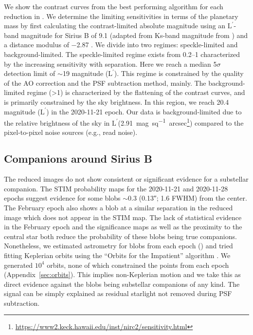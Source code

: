 \documentclass[twocolumn]{aastex631}
\newcommand\Lp{$\mathrm{L}^\prime$}
\begin{document}
We show the contrast curves from the best performing algorithm for each reduction in . We determine the limiting sensitivities in terms of the planetary mass by first calculating the contrast-limited absolute magnitude using an \Lp-band magnitude for Sirius B of 9.1 (adapted from Ks-band magnitude from \citealp{bonnet-bidaudADONISHighContrast2008a}) and a distance modulus of \num{-2.87} \citep{collaborationGaiaEarlyData2021a}. We divide  into two regimes: speckle-limited and background-limited. The speckle-limited regime exists from \qtyrange{0.2}{1}{\au} characterized by the increasing sensitivity with separation. Here we reach a median 5$\sigma$ detection limit of $\sim$19 magnitude (\Lp). This regime is constrained by the quality of the AO correction and the PSF subtraction method, mainly. The background-limited regime (\textgreater\qty{1}{\au}) is characterized by the flattening of the contrast curves, and is primarily constrained by the sky brightness. In this region, we reach 20.4 magnitude (\Lp) in the 2020-11-21 epoch. Our data is background-limited due to the relative brightness of the sky in \Lp (\qty{2.91}{mag\per sq. arcsec}\footnote{\url{https://www2.keck.hawaii.edu/inst/nirc2/sensitivity.html}}) compared to the pixel-to-pixel noise sources (e.g., read noise).

\subsection{Companions around Sirius B}

The reduced images do not show consistent or significant evidence for a substellar companion. The STIM probability maps for the 2020-11-21 and 2020-11-28 epochs suggest evidence for some blobs $\sim$\qty{0.3}{\au} (\ang{;;0.13}; 1.6 FWHM) from the center. The February epoch also shows a blob at a similar separation in the reduced image which does not appear in the STIM map. The lack of statistical evidence in the February epoch and the significance maps as well as the proximity to the central star both reduce the probability of these blobs being true companions. Nonetheless, we estimated astrometry for blobs from each epoch () and tried fitting Keplerian orbits using the ``Orbits for the Impatient'' algorithm \citep[OFTI;][]{bluntOrbitsImpatientBayesian2017a}. We generated $10^4$ orbits, none of which constrained the points from each epoch (Appendix~\ref{sec:orbits}). This implies non-Keplerian motion and we take this as direct evidence against the blobs being substellar companions of any kind. The signal can be simply explained as residual starlight not removed during PSF subtraction.
\end{document}
